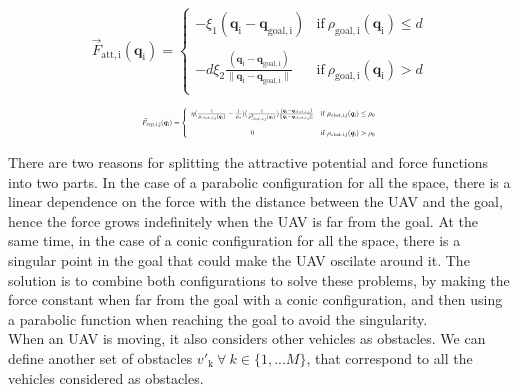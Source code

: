 \documentclass[journal]{IEEEtran}
\newcommand*{\subb}[1]{_{\mathrm{#1}}}
\begin{document}
		\begin{equation} \label{eq:force_att}
		\vec{F}\subb{att, i}(\bm{q}\subb{i}) =  \left\lbrace  {\begin{array}{cc}
			- \xi\subb{1} (\bm{q}\subb{i}-\bm{q}\subb{goal, i})& \textrm{if} \ \rho\subb{goal, i}(\bm{q}\subb{i})\leq d \\
			\\
			-d \xi\subb{2} \frac{(\bm{q}\subb{i}-\bm{q}\subb{goal, i})}{\parallel\bm{q}\subb{i}-\bm{q}\subb{goal,i}\parallel}&\textrm{if} \ \rho\subb{goal, i}(\bm{q}\subb{i})> d \\
			\end{array} } \right.
		\end{equation}
		
		\begin{equation} \label{eq:force_rep}	
		\resizebox{0.5\textwidth}{!}{ $
			\vec{F}\subb{rep, i,j}(\bm{q}\subb{i}) =  \left\lbrace  {\begin{array}{cc}
				\eta (\frac{1}{\rho\subb{obst,i,j}(\bm{q}\subb{i})}-\frac{1}{\rho\subb{0}})(\frac{1}{\rho\subb{obst,i,j}^2(\bm{q}\subb{i})})\frac{(\bm{q}\subb{i}-\bm{q}\subb{obst,i,j})}{\parallel\bm{q}\subb{i}-\bm{q}\subb{obst,i,j} \parallel} & \textrm{if} \ \rho\subb{obst,i,j}(\bm{q}\subb{i})\leq \rho\subb{0} \\
				\\
				0 &\textrm{if} \ \rho\subb{obst,i,j}(\bm{q}\subb{i})> \rho\subb{0} \\
				\end{array} } \right. $}
		\end{equation}
		
		There are two reasons for splitting the attractive potential and force functions into two parts. In the case of a parabolic configuration for all the space, there is a linear dependence on the force with the distance between the UAV and the goal, hence the force grows indefinitely when the UAV is far from the goal. At the same time, in the case of a conic configuration for all the space, there is a singular point in the goal that could make the UAV oscilate around it. The solution is to combine both configurations to solve these problems, by making the force constant when far from the goal with a conic configuration, and then using a parabolic function when reaching the goal to avoid the singularity.\\
		
		When an UAV is moving, it also considers other vehicles as obstacles. We can define another set of obstacles $v'\subb{k} \ \forall \ k \in \{1, ...M\}$, that correspond to all the vehicles considered as obstacles.\\
		
\end{document}
